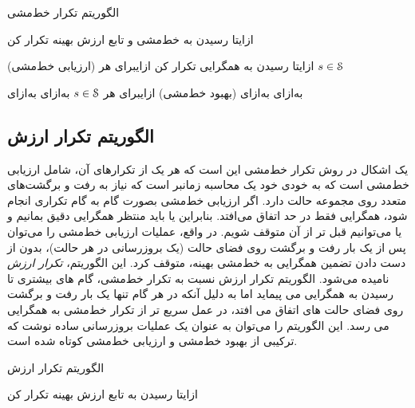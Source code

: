 {الگوریتم تکرار خط‌مشی}

‌ازای{تا رسیدن به خط‌مشی و تابع ارزش بهینه تکرار کن}

(ارزیابی خط‌مشی)
‌ازای{تا رسیدن به همگرایی تکرار کن}
‌ازای{برای هر $s \in \EuScript{S}$}

‌به‌ازای
‌به‌ازای
(بهبود خط‌مشی)
‌ازای{برای هر $s \in \EuScript{S}$}
‌به‌ازای
‌به‌ازای


\subsection{الگوریتم تکرار ارزش}
یک اشکال در روش تکرار خط‌مشی این است که هر یک از تکرارهای آن، شامل ارزیابی خط‌مشی است که
به خودی خود یک محاسبه زمان\nf بر است که نیاز به رفت و برگشت‌های متعدد روی مجموعه حالت دارد. اگر
ارزیابی خط‌مشی بصورت گام به گام تکراری انجام شود، همگرایی فقط در حد اتفاق می‌افتد. بنابراین یا باید منتظر همگرایی دقیق بمانیم و یا می‌توانیم قبل تر از آن متوقف شویم. 
در واقع، عملیات ارزیابی خط‌مشی را می‌توان پس از یک بار رفت و برگشت روی فضای حالت (یک بروزرسانی در هر حالت)،  بدون از دست دادن تضمین همگرایی به خط‌مشی بهینه، متوقف کرد. 
این الگوریتم،
\textit{تکرار ارزش}
 نامیده می‌شود. الگوریتم تکرار ارزش نسبت به تکرار خط‌مشی، گام های بیشتری تا رسیدن به همگرایی می پیماید اما به دلیل آنکه در هر گام تنها یک بار رفت و برگشت روی فضای حالت های اتفاق می افتد، در عمل سریع تر از تکرار خط‌مشی به همگرایی می رسد. این الگوریتم
را می‌توان به عنوان یک عملیات بروزرسانی ساده نوشت که ترکیبی از بهبود خط‌مشی و ارزیابی خط‌مشی کوتاه شده است.



{الگوریتم تکرار ارزش}

‌ازای{تا رسیدن به تابع ارزش بهینه تکرار کن}

